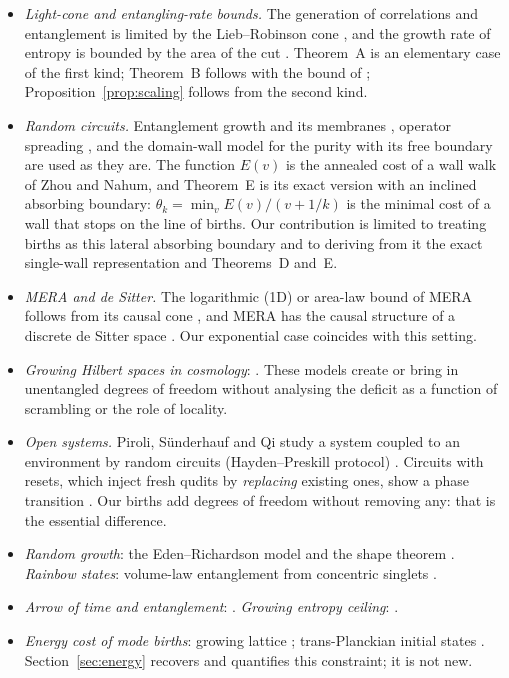\begin{itemize}[leftmargin=*,itemsep=2pt]
\item \emph{Light-cone and entangling-rate bounds.} The generation of correlations and entanglement is limited by the Lieb--Robinson cone \cite{BHV2006,EisertOsborne2006}, and the growth rate of entropy is bounded by the area of the cut \cite{Bravyi2007,VanAcoleyen2013,Marien2016}. Theorem~A is an elementary case of the first kind; Theorem~B follows \cite{BHV2006} with the bound of \cite{NSY2019}; Proposition~\ref{prop:scaling} follows from the second kind.
\item \emph{Random circuits.} Entanglement growth and its membranes \cite{NRVH2017,JHN2018,ZhouNahum2020,Sierant2023}, operator spreading \cite{NVH2018,vK2018}, and the domain-wall model for the purity with its free boundary \cite{ZhouNahum2019} are used as they are. The function $E(v)$ is the annealed cost of a wall walk of Zhou and Nahum, and Theorem~E is its exact version with an inclined absorbing boundary: $\theta_k=\min_vE(v)/(v+1/k)$ is the minimal cost of a wall that stops on the line of births. Our contribution is limited to treating births as this lateral absorbing boundary and to deriving from it the exact single-wall representation and Theorems~D and~E.
\item \emph{MERA and de Sitter.} The logarithmic (1D) or area-law bound of MERA follows from its causal cone \cite{Vidal2007,Vidal2008}, and MERA has the causal structure of a discrete de Sitter space \cite{Beny2013,BaoDS2017}. Our exponential case coincides with this setting.
\item \emph{Growing Hilbert spaces in cosmology}: \cite{Jacobson1999,Bao2017,CotlerStrominger2022,Cao2023}. These models create or bring in unentangled degrees of freedom without analysing the deficit as a function of scrambling or the role of locality.
\item \emph{Open systems.} Piroli, S\"underhauf and Qi study a system coupled to an environment by random circuits (Hayden--Preskill protocol) \cite{PSQ2020}. Circuits with resets, which inject fresh qudits by \emph{replacing} existing ones, show a phase transition \cite{Yokoyama2026}. Our births add degrees of freedom without removing any: that is the essential difference.
\item \emph{Random growth}: the Eden--Richardson model and the shape theorem \cite{Eden1961,Richardson1973,CoxDurrett1981}. \emph{Rainbow states}: volume-law entanglement from concentric singlets \cite{Vitagliano2010}.
\item \emph{Arrow of time and entanglement}: \cite{AlKhaliliChen2024}. \emph{Growing entropy ceiling}: \cite{Layzer1975,Frautschi1982}.
\item \emph{Energy cost of mode births}: growing lattice \cite{FosterJacobson2004}; trans-Planckian initial states \cite{MartinBrandenberger2001,Danielsson2002,KKLS2002}. Section~\ref{sec:energy} recovers and quantifies this constraint; it is not new.
\end{itemize}
